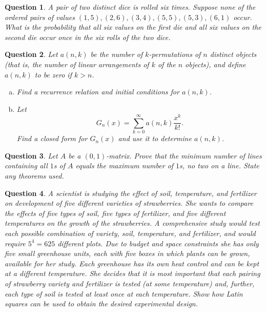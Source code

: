 \documentclass[12]{article}
\newtheorem{question}{Question}
\theoremstyle{definition}
\begin{document}
	\begin{question}
		A pair of two distinct dice is rolled six times.  Suppose none of the ordered pairs of values $(1,5), (2,6), (3,4), (5,5), (5,3), (6,1)$ occur.  What is the probability that all six values on the first die and all six values on the second die occur once in the six rolls of the two dice.
	\end{question}

	\begin{question}
		Let $a(n,k)$ be the number of $k$-permutations of $n$ distinct objects (that is, the number of linear arrangements of $k$ of the $n$ objects), and define $a(n,k)$ to be zero if $k > n$.
		\begin{enumerate}[a)]
			\item Find a recurrence relation and initial conditions for $a(n,k)$.
			\item Let 
			$$G_n(x) = \sum_{k=0}^\infty a(n,k)\frac{x^k}{k!}.$$
			Find a closed form for $G_n(x)$ and use it to determine $a(n,k)$.
		\end{enumerate}
	\end{question}
	\begin{question}
		Let $A$ be a $(0,1)$-matrix.  Prove that the minimum number of lines containing all $1$s of $A$ equals the maximum number of $1$s, no two on a line.  State any theorems used.
	\end{question}

	\begin{question}
		A scientist is studying the effect of soil, temperature, and fertilizer on development of five different varieties of strawberries.  She wants to compare the effects of five types of soil, five types of fertilizer, and five different temperatures on the growth of the strawberries.  A comprehensive study would test each possible combination of variety, soil, temperature, and fertilizer, and would require $5^4 = 625$ different plots.  Due to budget and space constraints she has only five small greenhouse units, each with five boxes in which plants can be grown, available for her study.  Each greenhouse has its own heat control and can be kept at a different temperature.  She decides that it is most important that each pairing of strawberry variety and fertilizer is tested (at some temperature) and, further, each type of soil is tested at least once at each temperature.  Show how Latin squares can be used to obtain the desired experimental design.
	\end{question}
\end{document}
